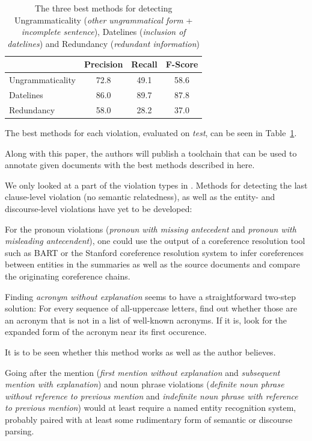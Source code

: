 \documentclass[a4paper,10pt]{scrartcl}
\theoremstyle{style}
\begin{document}
\begin{table}[H]
\begin{center}
\begin{tabular}{|l|c|c|c|}
  \hline
   & Precision & Recall & F-Score\\
  \hline
  Ungrammaticality & 72.8 & 49.1 & 58.6\\
  \hline
  Datelines & 86.0 & 89.7 & 87.8\\
  \hline
  Redundancy & 58.0 & 28.2 & 37.0\\
  \hline
  \end{tabular}
\end{center}
\label{eval_best}
\caption{The three best methods for detecting Ungrammaticality (\textit{other ungrammatical form} + \textit{incomplete sentence}), Datelines (\textit{inclusion of datelines}) and Redundancy (\textit{redundant information})}
\end{table}

The best methods for each violation, evaluated on \textit{test}, can be seen in Table~\ref{eval_best}.

Along with this paper, the authors will publish a toolchain that can be used to annotate given documents with the best methods described in here.

We only looked at a part of the violation types in \cite{friedrichlqvsumm}. Methods for detecting the last clause-level violation (no semantic relatedness), as well as the entity- and discourse-level violations have yet to be developed:

For the pronoun violations (\textit{pronoun with missing antecedent} and \textit{pronoun with misleading antecendent}), one could use the output of a coreference resolution tool such as BART \citep{versley2008bart} or the Stanford coreference resolution system \citep{lee2011stanford} to infer coreferences between entities in the summaries as well as the source documents and compare the originating coreference chains.

Finding \textit{acronym without explanation} seems to have a straightforward two-step solution: For every sequence of all-uppercase letters, find out whether those are an acronym that is not in a list of well-known acronyms. If it is, look for the expanded form of the acronym near its first occurence.

It is to be seen whether this method works as well as the author believes.

Going after the mention (\textit{first mention without explanation} and \textit{subsequent mention with explanation}) and noun phrase violations (\textit{definite noun phrase without reference to previous mention} and \textit{indefinite noun phrase with reference to previous mention}) would at least require a named entity recognition system, probably paired with at least some rudimentary form of semantic or discourse parsing.
\end{document}
